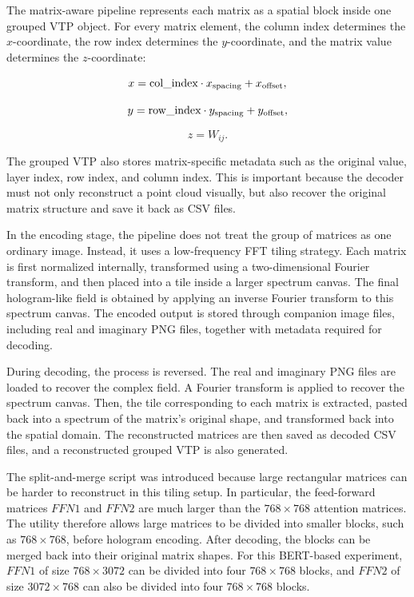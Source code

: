 \documentclass{article}
\begin{document}
\begin{normalsize}
The matrix-aware pipeline represents each matrix as a spatial block inside one grouped VTP object. For every matrix element, the column index determines the \(x\)-coordinate, the row index determines the \(y\)-coordinate, and the matrix value determines the \(z\)-coordinate:

\[
x = \textnormal{col\_index} \cdot x_{\textnormal{spacing}} + x_{\textnormal{offset}},
\]

\[
y = \textnormal{row\_index} \cdot y_{\textnormal{spacing}} + y_{\textnormal{offset}},
\]

\[
z = W_{ij}.
\]

The grouped VTP also stores matrix-specific metadata such as the original value, layer index, row index, and column index. This is important because the decoder must not only reconstruct a point cloud visually, but also recover the original matrix structure and save it back as CSV files.

In the encoding stage, the pipeline does not treat the group of matrices as one ordinary image. Instead, it uses a low-frequency FFT tiling strategy. Each matrix is first normalized internally, transformed using a two-dimensional Fourier transform, and then placed into a tile inside a larger spectrum canvas. The final hologram-like field is obtained by applying an inverse Fourier transform to this spectrum canvas. The encoded output is stored through companion image files, including real and imaginary PNG files, together with metadata required for decoding.

During decoding, the process is reversed. The real and imaginary PNG files are loaded to recover the complex field. A Fourier transform is applied to recover the spectrum canvas. Then, the tile corresponding to each matrix is extracted, pasted back into a spectrum of the matrix's original shape, and transformed back into the spatial domain. The reconstructed matrices are then saved as decoded CSV files, and a reconstructed grouped VTP is also generated.

The split-and-merge script was introduced because large rectangular matrices can be harder to reconstruct in this tiling setup. In particular, the feed-forward matrices \(FFN1\) and \(FFN2\) are much larger than the \(768 \times 768\) attention matrices. The utility therefore allows large matrices to be divided into smaller blocks, such as \(768 \times 768\), before hologram encoding. After decoding, the blocks can be merged back into their original matrix shapes. For this BERT-based experiment, \(FFN1\) of size \(768 \times 3072\) can be divided into four \(768 \times 768\) blocks, and \(FFN2\) of size \(3072 \times 768\) can also be divided into four \(768 \times 768\) blocks.


\end{normalsize}
\end{document}

